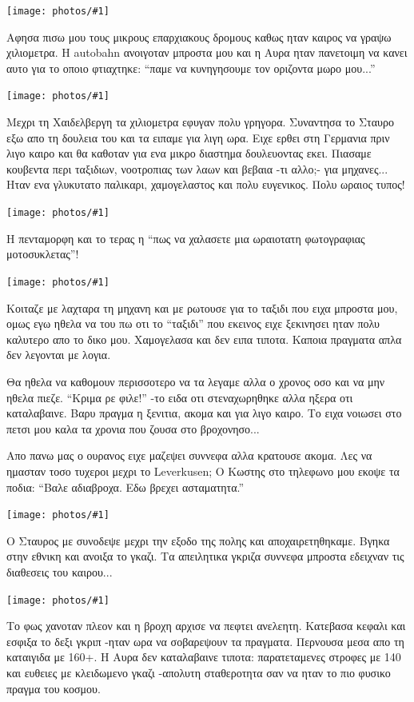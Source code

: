 \documentclass[11pt, letterpaper]{book}
\newcommand\photo[1]{\noindent\texttt{[image: photos/\#1]}}
\begin{document}
\photo{117.jpg}

Αφησα πισω μου τους μικρους επαρχιακους δρομους καθως ηταν καιρος να γραψω χιλιομετρα. Η autobahn ανοιγοταν μπροστα μου και η Αυρα ηταν πανετοιμη να κανει αυτο για το οποιο φτιαχτηκε: ``παμε να κυνηγησουμε τον οριζοντα μωρο μου...''

\photo{118.jpg}

Μεχρι τη Χαιδελβεργη τα χιλιομετρα εφυγαν πολυ γρηγορα. 
Συναντησα το Σταυρο εξω απο τη δουλεια του και τα ειπαμε για λιγη ωρα. Ειχε ερθει στη Γερμανια πριν λιγο καιρο και θα καθοταν για ενα μικρο διαστημα δουλευοντας εκει. Πιασαμε κουβεντα περι ταξιδιων, νοοτροπιας των λαων και βεβαια -τι αλλο;- για μηχανες... Ηταν ενα γλυκυτατο παλικαρι, χαμογελαστος και πολυ ευγενικος. 
Πολυ ωραιος τυπος!

\photo{119.jpg}

Η πενταμορφη και το τερας η ``πως να χαλασετε μια ωραιοτατη φωτογραφιας μοτοσυκλετας''!

\photo{120.jpg}

Κοιταζε με λαχταρα τη μηχανη και με ρωτουσε για το ταξιδι που ειχα μπροστα μου, ομως εγω ηθελα να του πω οτι το ``ταξιδι'' που εκεινος ειχε ξεκινησει ηταν πολυ καλυτερο απο το δικο μου. Xαμογελασα και δεν ειπα τιποτα. Καποια πραγματα απλα δεν λεγονται με λογια.

Θα ηθελα να καθομουν περισσοτερο να τα λεγαμε αλλα ο χρονος οσο και να μην ηθελα πιεζε. 
``Κριμα ρε φιλε!'' -το ειδα οτι στεναχωρηθηκε αλλα ηξερα οτι καταλαβαινε. Βαρυ πραγμα η ξενιτια, ακομα και για λιγο καιρο. Το ειχα νοιωσει στο πετσι μου καλα τα χρονια που ζουσα στο βροχονησο...

Απο πανω μας ο ουρανος ειχε μαζεψει συννεφα αλλα κρατουσε ακομα. Λες να ημασταν τοσο τυχεροι μεχρι το Leverkusen; Ο Κωστης στο τηλεφωνο μου εκοψε τα ποδια: ``Βαλε αδιαβροχα. Εδω βρεχει ασταματητα.''

\photo{121.jpg}

Ο Σταυρος με συνοδεψε μεχρι την εξοδο της πολης και αποχαιρετηθηκαμε. Βγηκα στην εθνικη και ανοιξα το γκαζι. Τα απειλητικα γκριζα συννεφα μπροστα εδειχναν τις διαθεσεις του καιρου...

\photo{122.jpg}

Το φως χανοταν πλεον και η βροχη αρχισε να πεφτει ανελεητη. Κατεβασα κεφαλι και εσφιξα το δεξι γκριπ -ηταν ωρα να σοβαρεψουν τα πραγματα. 
Περνουσα μεσα απο τη καταιγιδα με 160+. Η Αυρα δεν καταλαβαινε τιποτα: παρατεταμενες στροφες με 140 και ευθειες με κλειδωμενο γκαζι -απολυτη σταθεροτητα σαν να ηταν το πιο φυσικο πραγμα του κοσμου.
\end{document}
